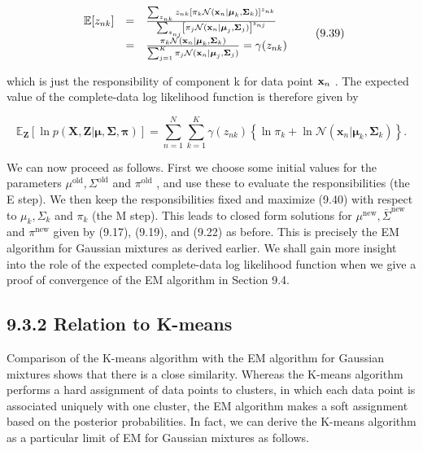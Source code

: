 \documentclass[
  10
]{article}
\begin{document}
\[
\begin{array}{r c l} \mathbb {E} [ z _ {n k} ] & = & \frac {\sum_ {z _ {n k}} z _ {n k} \left[ \pi_ {k} \mathcal {N} (\mathbf {x} _ {n} | \boldsymbol {\mu} _ {k} , \boldsymbol {\Sigma} _ {k}) \right] ^ {z _ {n k}}}{\sum_ {z _ {n j}} \left[ \pi_ {j} \mathcal {N} (\mathbf {x} _ {n} | \boldsymbol {\mu} _ {j} , \boldsymbol {\Sigma} _ {j}) \right] ^ {z _ {n j}}} \\ & = & \frac {\pi_ {k} \mathcal {N} (\mathbf {x} _ {n} | \boldsymbol {\mu} _ {k} , \boldsymbol {\Sigma} _ {k})}{\sum_ {j = 1} ^ {K} \pi_ {j} \mathcal {N} (\mathbf {x} _ {n} | \boldsymbol {\mu} _ {j} , \boldsymbol {\Sigma} _ {j})} = \gamma (z _ {n k}) \end{array}\tag{9.39}
\]

which is just the responsibility of component k for data point
\({ \bf x } _ { n }\) . The expected value of the complete-data log
likelihood function is therefore given by

\[
\mathbb {E} _ {\mathbf {Z}} [ \ln p (\mathbf {X}, \mathbf {Z} | \boldsymbol {\mu}, \boldsymbol {\Sigma}, \boldsymbol {\pi}) ] = \sum_ {n = 1} ^ {N} \sum_ {k = 1} ^ {K} \gamma (z _ {n k}) \left\{\ln \pi_ {k} + \ln \mathcal {N} (\mathbf {x} _ {n} | \boldsymbol {\mu} _ {k}, \boldsymbol {\Sigma} _ {k}) \right\}.\tag{9.40}
\]

We can now proceed as follows. First we choose some initial values for
the parameters
\(\mu ^ { \mathrm { o l d } } , \Sigma ^ { \mathrm { o l d } }\) and
\(\pi ^ { \mathrm { o l d } }\) , and use these to evaluate the
responsibilities (the E step). We then keep the responsibilities fixed
and maximize (9.40) with respect to \(\mu _ { k } , \Sigma _ { k }\) and
\(\pi _ { k }\) (the M step). This leads to closed form solutions for
\(\mu ^ { \mathrm { n e w } } , \bar { \Sigma } ^ { \mathrm { n e w } }\)
and \(\pi ^ { \mathrm { n e w } }\) given by (9.17), (9.19), and (9.22)
as before. This is precisely the EM algorithm for Gaussian mixtures as
derived earlier. We shall gain more insight into the role of the
expected complete-data log likelihood function when we give a proof of
convergence of the EM algorithm in Section 9.4.

\subsection{9.3.2 Relation to K-means}\label{relation-to-k-means}

Comparison of the K-means algorithm with the EM algorithm for Gaussian
mixtures shows that there is a close similarity. Whereas the K-means
algorithm performs a hard assignment of data points to clusters, in
which each data point is associated uniquely with one cluster, the EM
algorithm makes a soft assignment based on the posterior probabilities.
In fact, we can derive the K-means algorithm as a particular limit of EM
for Gaussian mixtures as follows.
\end{document}
